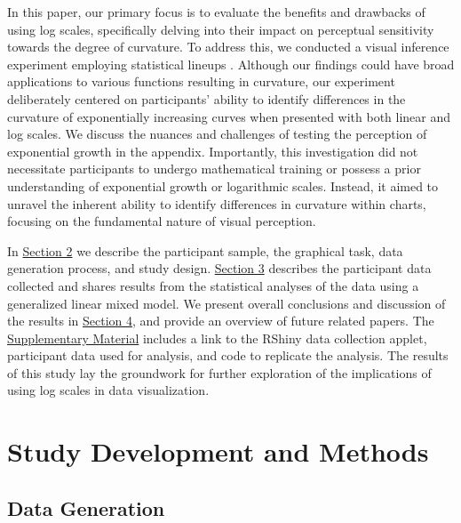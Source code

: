 \documentclass[12pt]{article}
\begin{document}
In this paper, our primary focus is to evaluate the benefits and
drawbacks of using log scales, specifically delving into their impact on
perceptual sensitivity towards the degree of curvature. To address this,
we conducted a visual inference experiment employing statistical lineups
\citep{buja_statistical_2009}. Although our findings could have broad
applications to various functions resulting in curvature, our experiment
deliberately centered on participants' ability to identify differences
in the curvature of exponentially increasing curves when presented with
both linear and log scales. We discuss the nuances and challenges of
testing the perception of exponential growth in the appendix.
Importantly, this investigation did not necessitate participants to
undergo mathematical training or possess a prior understanding of
exponential growth or logarithmic scales. Instead, it aimed to unravel
the inherent ability to identify differences in curvature within charts,
focusing on the fundamental nature of visual perception.

In \protect\hyperlink{methods}{Section 2} we describe the participant
sample, the graphical task, data generation process, and study design.
\protect\hyperlink{results}{Section 3} describes the participant data
collected and shares results from the statistical analyses of the data
using a generalized linear mixed model. We present overall conclusions
and discussion of the results in
\protect\hyperlink{conclusion-discussion}{Section 4}, and provide an
overview of future related papers. The
\protect\hyperlink{supplementary-material}{Supplementary Material}
includes a link to the RShiny data collection applet, participant data
used for analysis, and code to replicate the analysis. The results of
this study lay the groundwork for further exploration of the
implications of using log scales in data visualization.

\hypertarget{methods}{%
\section{Study Development and Methods}\label{methods}}

\citep{Rstudio}

\hypertarget{data-generation}{%
\subsection{Data Generation}\label{data-generation}}
\end{document}
